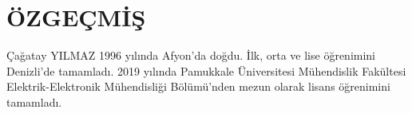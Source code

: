 \backmatter

\chapter{ÖZGEÇMİŞ}

Çağatay YILMAZ 1996 yılında Afyon'da doğdu. İlk, orta ve lise öğrenimini Denizli'de tamamladı. 2019 yılında Pamukkale Üniversitesi Mühendislik Fakültesi Elektrik-Elektronik Mühendisliği Bölümü'nden mezun olarak lisans öğrenimini tamamladı.
